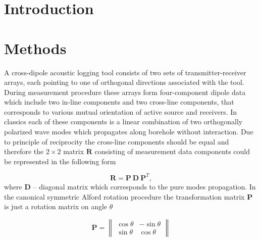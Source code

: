 \documentclass[a4paper,11pt]{article}
\begin{document}
\section{Introduction}

\section{Methods}
A cross-dipole acoustic logging tool consists of two sets of transmitter-receiver arrays, each pointing to one of orthogonal directions associated with the tool. During measurement procedure these arrays form four-component dipole data which include two in-line components and two cross-line components, that corresponds to various mutual orientation of active source and receivers. In classics each of these components is a linear combination of two orthogonally polarized wave modes which propagates along borehole without interaction. Due to principle of reciprocity the cross-line components should be equal and therefore the $2\times 2$ matrix $\mathbf{R}$ consisting of measurement data components could be represented in the following form

\begin{equation}
\mathbf{R} = \mathbf{P} \ \mathbf{D} \ \mathbf{P}^T, \label{eq:alford_symmetric} 
\end{equation}
where $\mathbf{D}$ -- diagonal matrix which corresponds to the pure modes propagation. In the canonical symmetric Alford rotation \cite{Alford1986} procedure the transformation matrix $\mathbf{P}$ is just a rotation matrix on angle $\theta$

\begin{equation*}
\mathbf{P} = \left\|
\begin{array}{cc}
\cos \theta &-\sin \theta \\ 
\sin \theta & \cos \theta
\end{array} 
\right\| 
\end{equation*}
\end{document}
